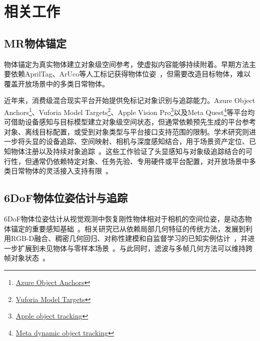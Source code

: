 \documentclass[review]{vgtc}
\begin{document}
\section{相关工作}\label{sec:related-work}

\subsection{MR物体锚定}

物体锚定为真实物体建立对象级空间参考，使虚拟内容能够持续附着。早期方法主要依赖AprilTag、ArUco等人工标记获得物体位姿~\cite{apriltag2011,aruco2014}，但需要改造目标物体，难以覆盖开放场景中的多类日常物体。

近年来，消费级混合现实平台开始提供免标记对象识别与追踪能力。Azure Object Anchors\footnote{\href{https://learn.microsoft.com/en-us/dynamics365/mixed-reality/guides/pc-app-anchor-object}{Azure Object Anchors}}、Vuforia Model Targets\footnote{\href{https://developer.vuforia.com/library/vuforia-engine/images-and-objects/model-targets/model-targets/}{Vuforia Model Targets}}、Apple Vision Pro\footnote{\href{https://developer.apple.com/documentation/visionos/implementing-object-tracking-in-your-app}{Apple object tracking}}以及Meta Quest\footnote{\href{https://developers.meta.com/horizon/documentation/native/android/mobile-dynamic-object-tracker/}{Meta dynamic object tracking}}等平台均可借助设备感知与目标模型建立对象级空间状态，但通常依赖预先生成的平台参考对象、离线目标配置，或受到对象类型与平台接口支持范围的限制。学术研究则进一步将头显的设备追踪、空间映射、相机与深度感知结合，用于场景资产定位、已知物体注册以及持续对象追踪~\cite{fan2021assettracking,doughty2022hmdegopose,pollabauer2023hololens,martingomez2024sttar,trojak2025mixedpose,greene2025markerless,trojak2026markerless,gbot2024}。这些工作验证了头显感知与对象级追踪结合的可行性，但通常仍依赖特定对象、任务先验、专用硬件或平台配置，对开放场景中多类日常物体的灵活接入支持有限~\cite{hurt2025surrealitycv}。

\subsection{6DoF物体位姿估计与追踪}

6DoF物体位姿估计从视觉观测中恢复刚性物体相对于相机的空间位姿，是动态物体锚定的重要感知基础~\cite{aguirrezabal2026survey}。相关研究已从依赖局部几何特征的传统方法，发展到利用RGB-D融合、稠密几何回归、对称性建模和自监督学习的已知实例估计~\cite{densefusion2019,epos2020,gdrnet2021,self6d2020}，并进一步扩展到未见物体与零样本场景~\cite{gen6d2022,megapose2022,lin2024sam6d,ornek2024foundpose,moon2025coop,foundationpose2024}。与此同时，滤波与多帧几何方法可以维持跨帧对象状态~\cite{poserbpf2021,bundletrack2021}。
\end{document}
